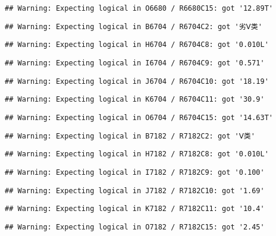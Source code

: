 \documentclass[
]{article}
\begin{document}
\begin{verbatim}
## Warning: Expecting logical in O6680 / R6680C15: got '12.89T'
\end{verbatim}

\begin{verbatim}
## Warning: Expecting logical in B6704 / R6704C2: got '劣Ⅴ类'
\end{verbatim}

\begin{verbatim}
## Warning: Expecting logical in H6704 / R6704C8: got '0.010L'
\end{verbatim}

\begin{verbatim}
## Warning: Expecting logical in I6704 / R6704C9: got '0.571'
\end{verbatim}

\begin{verbatim}
## Warning: Expecting logical in J6704 / R6704C10: got '18.19'
\end{verbatim}

\begin{verbatim}
## Warning: Expecting logical in K6704 / R6704C11: got '30.9'
\end{verbatim}

\begin{verbatim}
## Warning: Expecting logical in O6704 / R6704C15: got '14.63T'
\end{verbatim}

\begin{verbatim}
## Warning: Expecting logical in B7182 / R7182C2: got 'Ⅴ类'
\end{verbatim}

\begin{verbatim}
## Warning: Expecting logical in H7182 / R7182C8: got '0.010L'
\end{verbatim}

\begin{verbatim}
## Warning: Expecting logical in I7182 / R7182C9: got '0.100'
\end{verbatim}

\begin{verbatim}
## Warning: Expecting logical in J7182 / R7182C10: got '1.69'
\end{verbatim}

\begin{verbatim}
## Warning: Expecting logical in K7182 / R7182C11: got '10.4'
\end{verbatim}

\begin{verbatim}
## Warning: Expecting logical in O7182 / R7182C15: got '2.45'
\end{verbatim}
\end{document}
